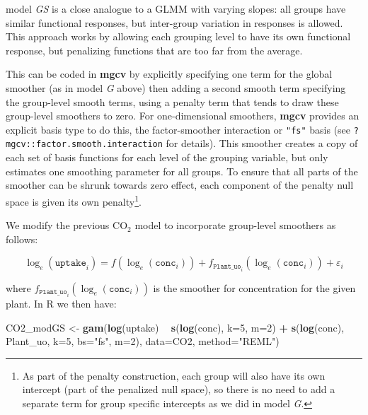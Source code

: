 \documentclass[12pt]{article}
\newenvironment{Shaded}{\begin{snugshade}}{\end{snugshade}}
\newcommand{\KeywordTok}[1]{\textcolor[rgb]{0.13,0.29,0.53}{\textbf{#1}}}
\newcommand{\DataTypeTok}[1]{\textcolor[rgb]{0.13,0.29,0.53}{#1}}
\newcommand{\DecValTok}[1]{\textcolor[rgb]{0.00,0.00,0.81}{#1}}
\newcommand{\StringTok}[1]{\textcolor[rgb]{0.31,0.60,0.02}{#1}}
\newcommand{\OperatorTok}[1]{\textcolor[rgb]{0.81,0.36,0.00}{\textbf{#1}}}
\newcommand{\NormalTok}[1]{#1}
\let\rmarkdownfootnote\footnote%
\def\footnote{\protect\rmarkdownfootnote}
\begin{document}
model \emph{GS} is a close analogue to a GLMM with varying slopes: all
groups have similar functional responses, but inter-group variation in
responses is allowed. This approach works by allowing each grouping
level to have its own functional response, but penalizing functions that
are too far from the average.

This can be coded in \textbf{mgcv} by explicitly specifying one term for
the global smoother (as in model \emph{G} above) then adding a second
smooth term specifying the group-level smooth terms, using a penalty
term that tends to draw these group-level smoothers to zero. For
one-dimensional smoothers, \textbf{mgcv} provides an explicit basis type
to do this, the factor-smoother interaction or \texttt{"fs"} basis (see
\texttt{?mgcv::factor.smooth.interaction} for details). This smoother
creates a copy of each set of basis functions for each level of the
grouping variable, but only estimates one smoothing parameter for all
groups. To ensure that all parts of the smoother can be shrunk towards
zero effect, each component of the penalty null space is given its own
penalty\footnote{As part of the penalty construction, each group will
  also have its own intercept (part of the penalized null space), so
  there is no need to add a separate term for group specific intercepts
  as we did in model \emph{G}.}.

We modify the previous \(\text{CO}_2\) model to incorporate group-level
smoothers as follows:

\[
\log_e(\texttt{uptake}_i) = f(\log_e(\texttt{conc}_i)) + f_{\texttt{Plant\_uo}_i}(\log_e(\texttt{conc}_i)) + \varepsilon_i
\]

where \(f_{\texttt{Plant\_uo}_i}(\log_e(\texttt{conc}_i))\) is the
smoother for concentration for the given plant. In R we then have:

\begin{Shaded}
\begin{Highlighting}[]
\NormalTok{CO2_modGS <-}\StringTok{ }\KeywordTok{gam}\NormalTok{(}\KeywordTok{log}\NormalTok{(uptake) }\OperatorTok{~}\StringTok{ }\KeywordTok{s}\NormalTok{(}\KeywordTok{log}\NormalTok{(conc), }\DataTypeTok{k=}\DecValTok{5}\NormalTok{, }\DataTypeTok{m=}\DecValTok{2}\NormalTok{) }\OperatorTok{+}\StringTok{ }
\StringTok{                   }\KeywordTok{s}\NormalTok{(}\KeywordTok{log}\NormalTok{(conc), Plant_uo, }\DataTypeTok{k=}\DecValTok{5}\NormalTok{,  }\DataTypeTok{bs=}\StringTok{"fs"}\NormalTok{, }\DataTypeTok{m=}\DecValTok{2}\NormalTok{),}
                 \DataTypeTok{data=}\NormalTok{CO2, }\DataTypeTok{method=}\StringTok{"REML"}\NormalTok{)}
\end{Highlighting}
\end{Shaded}
\end{document}
